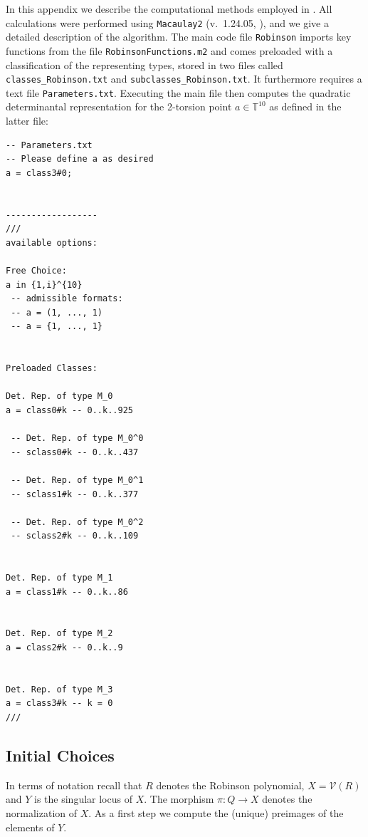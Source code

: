 \documentclass[a4paper,10pt]{amsart}
\theoremstyle{definition}
\theoremstyle{plain}
\newcommand{\cV}{{\mathcal V}}
\begin{document}
In this appendix we describe the computational methods employed in . All calculations were performed using \texttt{Macaulay2} (v.~1.24.05, \cite{M2}), and we give a detailed description of the algorithm. The main code file \texttt{Robinson} imports key functions from the file \texttt{RobinsonFunctions.m2} and comes preloaded with a classification of the representing types, stored in two files called \texttt{classes\_Robinson.txt} and \texttt{subclasses\_Robinson.txt}. It furthermore requires a text file \texttt{Parameters.txt}. Executing the main file then computes the quadratic determinantal representation for the 2-torsion point $a \in \mathbb{T}^{10}$ as defined in the latter file:
\begin{oframed}
\begin{verbatim}
-- Parameters.txt
-- Please define a as desired
a = class3#0;


------------------
///
available options:

Free Choice:
a in {1,i}^{10}
 -- admissible formats:
 -- a = (1, ..., 1)
 -- a = {1, ..., 1}


Preloaded Classes:

Det. Rep. of type M_0
a = class0#k -- 0..k..925

 -- Det. Rep. of type M_0^0
 -- sclass0#k -- 0..k..437

 -- Det. Rep. of type M_0^1
 -- sclass1#k -- 0..k..377

 -- Det. Rep. of type M_0^2
 -- sclass2#k -- 0..k..109


Det. Rep. of type M_1
a = class1#k -- 0..k..86


Det. Rep. of type M_2
a = class2#k -- 0..k..9


Det. Rep. of type M_3
a = class3#k -- k = 0
///
\end{verbatim}
\end{oframed}

\subsection{Initial Choices}

In terms of notation recall that $R$ denotes the Robinson polynomial, $X = \cV(R)$ and $Y$ is the singular locus of $X$. The morphism $\pi \colon Q \to X$ denotes the normalization of $X$. As a first step we compute the (unique) preimages of the elements of $Y$.
\end{document}
